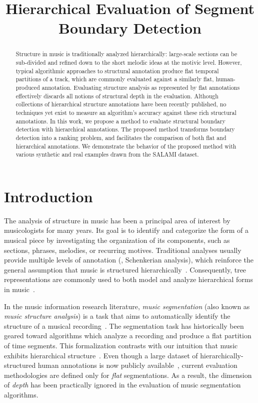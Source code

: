 \documentclass{article}
\title{Hierarchical Evaluation of Segment Boundary Detection}
\begin{document}
%
\maketitle
%
\begin{abstract}
Structure in music is traditionally analyzed hierarchically: large-scale sections can be sub-divided and refined down to the short melodic ideas at the motivic level. 
However, typical algorithmic approaches to structural annotation produce flat temporal partitions of a track, which are commonly evaluated against a similarly flat, human-produced
annotation. Evaluating structure analysis as represented by flat annotations effectively discards all notions of structural depth in the evaluation.
Although collections of hierarchical structure annotations have been recently published, no techniques yet exist to measure an algorithm's accuracy against these rich structural annotations.
In this work, we propose a method to evaluate structural boundary detection with hierarchical annotations.
The proposed method transforms boundary detection into a ranking problem, and facilitates the comparison of
both flat and hierarchical annotations.
We demonstrate the behavior of the proposed method with various synthetic and real
examples drawn from the SALAMI dataset. 
\end{abstract}
%
\section{Introduction}\label{sec:introduction}

The analysis of structure in music has been a principal area of interest by musicologists for many years.
Its goal is to identify and categorize the form of a musical piece by investigating the organization of its components, such as sections, phrases, melodies, or recurring motives.
Traditional analyses usually provide multiple levels of annotation (\eg, Schenkerian analysis), which reinforce the general assumption that music is structured hierarchically~\cite{Lerdahl1983a}.
Consequently, tree representations are commonly used to both model and analyze hierarchical forms in music~\cite{Lerdahl1983}.

In the music information research literature, \emph{music segmentation} (also known as \emph{music structure
analysis}) is a task that aims to automatically identify the structure of a musical recording~\cite{Paulus2010}.
The segmentation task has historically been geared toward algorithms which analyze a recording and produce a
flat partition of time segments.
This formalization contrasts with our intuition that music exhibits hierarchical
structure~\cite{Peeters2009}.
Even though a large dataset of hierarchically-structured human annotations is now publicly
available~\cite{Smith2011},
current evaluation methodologies are defined only for \emph{flat} segmentations.
As a result, the dimension of \emph{depth} has been practically ignored in the evaluation of music segmentation algorithms.
\end{document}
